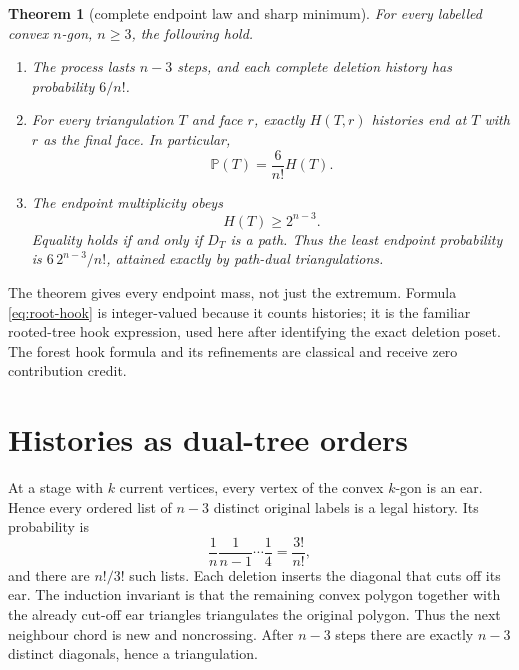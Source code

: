 \documentclass[a4paper,10pt]{amsart}
\newtheorem{theorem}{Theorem}
\theoremstyle{remark}
\newcommand{\Prob}{\mathbb P}
\begin{document}
\begin{theorem}[complete endpoint law and sharp minimum]\label{thm:main}
For every labelled convex $n$-gon, $n\ge3$, the following hold.
\begin{enumerate}
\item The process lasts $n-3$ steps, and each complete deletion history has
probability $6/n!$.
\item For every triangulation $T$ and face $r$, exactly $H(T,r)$ histories
end at $T$ with $r$ as the final face.  In particular,
\begin{equation}\label{eq:endpoint-law}
       \Prob(T)=\frac{6}{n!}H(T).
\end{equation}
\item The endpoint multiplicity obeys
\begin{equation}\label{eq:lower}
       H(T)\ge 2^{n-3}.
\end{equation}
Equality holds if and only if $D_T$ is a path.  Thus the least endpoint
probability is $6\,2^{n-3}/n!$, attained exactly by path-dual triangulations.
\end{enumerate}
\end{theorem}

The theorem gives every endpoint mass, not just the extremum.  Formula
\eqref{eq:root-hook} is integer-valued because it counts histories; it is the
familiar rooted-tree hook expression, used here after identifying the exact
deletion poset.  The forest hook formula and its refinements are classical
\cite{BjornerWachs1989} and receive zero contribution credit.

\section{Histories as dual-tree orders}

At a stage with $k$ current vertices, every vertex of the convex $k$-gon is
an ear.  Hence every ordered list of $n-3$ distinct original labels is a
legal history.  Its probability is
\begin{equation}\label{eq:history-prob}
 \frac1n\frac1{n-1}\cdots\frac14=\frac{3!}{n!},
\end{equation}
and there are $n!/3!$ such lists.  Each deletion inserts the diagonal that
cuts off its ear.  The induction invariant is that the remaining convex
polygon together with the already cut-off ear triangles triangulates the
original polygon.  Thus the next neighbour chord is new and noncrossing.
After $n-3$ steps there are exactly $n-3$ distinct diagonals, hence a
triangulation.
\end{document}
